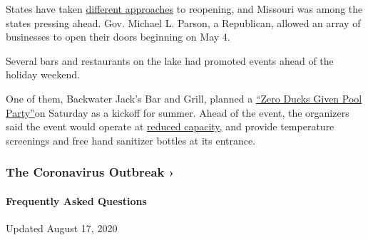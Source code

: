 States have taken
\href{https://www.nytimes3xbfgragh.onion/2020/05/17/us/coronavirus-states-reopen.html}{different
approaches} to reopening, and Missouri was among the states pressing
ahead. Gov. Michael L. Parson, a Republican, allowed an array of
businesses to open their doors beginning on May 4.

Several bars and restaurants on the lake had promoted events ahead of
the holiday weekend.

One of them, Backwater Jack's Bar and Grill, planned a
\href{https://www.facebookcorewwwi.onion/events/1063342204023968}{``Zero
Ducks Given Pool Party''}on Saturday as a kickoff for summer. Ahead of
the event, the organizers said the event would operate at
\href{http://backwaterjackslo.blogspot.com/2020/05/dont-miss-zero-ducks-given-memorial-day.html\#comments}{reduced
capacity,} and provide temperature screenings and free hand sanitizer
bottles at its entrance.

\href{https://www.nytimes3xbfgragh.onion/news-event/coronavirus?action=click\&pgtype=Article\&state=default\&region=MAIN_CONTENT_3\&context=storylines_faq}{}

\hypertarget{the-coronavirus-outbreak-}{%
\subsubsection{The Coronavirus Outbreak
›}\label{the-coronavirus-outbreak-}}

\hypertarget{frequently-asked-questions}{%
\paragraph{Frequently Asked
Questions}\label{frequently-asked-questions}}

Updated August 17, 2020

